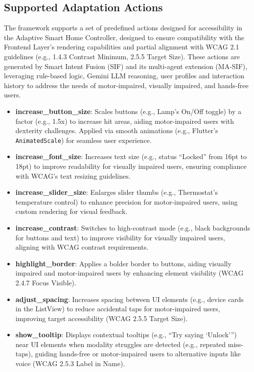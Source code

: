 \documentclass[openany]{book}
\begin{document}
\subsection{Supported Adaptation Actions}
The framework supports a set of predefined actions designed for accessibility in the Adaptive Smart Home Controller, designed to ensure compatibility with the Frontend Layer’s rendering capabilities and partial alignment with WCAG 2.1 guidelines (e.g., 1.4.3 Contrast Minimum, 2.5.5 Target Size). These actions are generated by Smart Intent Fusion (SIF) and its multi-agent extension (MA-SIF), leveraging rule-based logic, Gemini LLM reasoning, user profiles and interaction history to address the needs of motor-impaired, visually impaired, and hands-free users.
\begin{itemize}
    \item \textbf{increase\_button\_size}: Scales buttons (e.g., Lamp’s On/Off toggle) by a factor (e.g., 1.5x) to increase hit areas, aiding motor-impaired users with dexterity challenges. Applied via smooth animations (e.g., Flutter’s \texttt{AnimatedScale}) for seamless user experience.
    \item \textbf{increase\_font\_size}: Increases text size (e.g., status “Locked” from 16pt to 18pt) to improve readability for visually impaired users, ensuring compliance with WCAG’s text resizing guidelines.
    \item \textbf{increase\_slider\_size}: Enlarges slider thumbs (e.g., Thermostat’s temperature control) to enhance precision for motor-impaired users, using custom rendering for visual feedback.
    \item \textbf{increase\_contrast}: Switches to high-contrast mode (e.g., black backgrounds for buttons and text) to improve visibility for visually impaired users, aligning with WCAG contrast requirements.
    \item \textbf{highlight\_border}: Applies a bolder border to buttons, aiding visually impaired and motor-impaired users by enhancing element visibility (WCAG 2.4.7 Focus Visible).
    \item \textbf{adjust\_spacing}: Increases spacing between UI elements (e.g., device cards in the ListView) to reduce accidental taps for motor-impaired users, improving target accessibility (WCAG 2.5.5 Target Size).
    \item \textbf{show\_tooltip}: Displays contextual tooltips (e.g., “Try saying ‘Unlock’”) near UI elements when modality struggles are detected (e.g., repeated miss-taps), guiding hands-free or motor-impaired users to alternative inputs like voice (WCAG 2.5.3 Label in Name).

\end{itemize}
\end{document}
